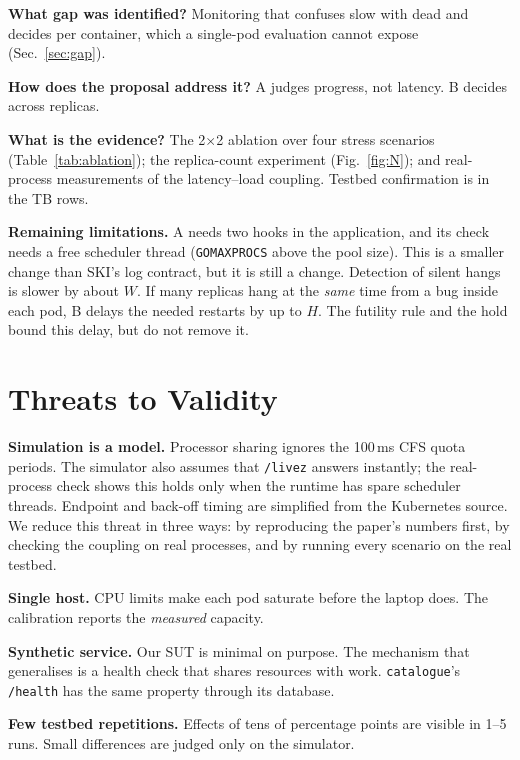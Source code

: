 \documentclass[conference]{IEEEtran}
\begin{document}
\textbf{What gap was identified?} Monitoring that confuses slow with
dead and decides per container, which a single-pod evaluation cannot
expose (Sec.~\ref{sec:gap}).

\textbf{How does the proposal address it?} A judges progress, not
latency. B decides across replicas.

\textbf{What is the evidence?} The 2$\times$2 ablation over four stress
scenarios (Table~\ref{tab:ablation}); the replica-count experiment
(Fig.~\ref{fig:N}); and real-process measurements of the
latency--load coupling. Testbed confirmation is in the TB rows.

\textbf{Remaining limitations.} A needs two hooks in the application,
and its check needs a free scheduler thread (\texttt{GOMAXPROCS} above
the pool size).
This is a smaller change than SKI's log contract, but it is still a
change. Detection of silent hangs is slower by about $W$. If many
replicas hang at the \emph{same} time from a bug inside each pod, B
delays the needed restarts by up to $H$. The futility rule and the hold
bound this delay, but do not remove it.

\section{Threats to Validity}
\label{sec:threats}
\textbf{Simulation is a model.} Processor sharing ignores the 100\,ms CFS
quota periods. The simulator also assumes that \texttt{/livez} answers
instantly; the real-process check shows this holds only when the
runtime has spare scheduler threads. Endpoint and back-off timing are simplified from the
Kubernetes source. We reduce this threat in three ways: by reproducing
the paper's numbers first, by checking the coupling on real processes,
and by running every scenario on the real testbed.

\textbf{Single host.} CPU limits make each pod saturate before the
laptop does. The calibration reports the \emph{measured} capacity.

\textbf{Synthetic service.} Our SUT is minimal on purpose. The mechanism
that generalises is a health check that shares resources with work.
\texttt{catalogue}'s \texttt{/health} has the same property through its
database.

\textbf{Few testbed repetitions.} Effects of tens of percentage points
are visible in 1--5 runs. Small differences are judged only on the
simulator.
\end{document}
